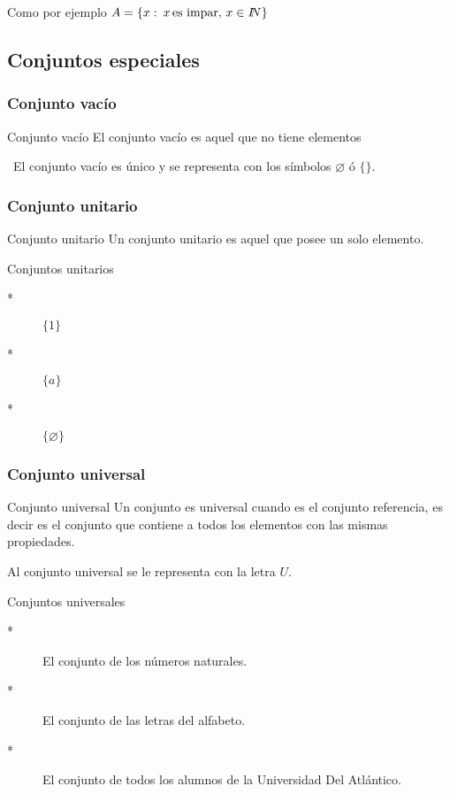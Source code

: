 Como por ejemplo $A=\{x:\: x\,\mbox{es impar, \ensuremath{x\in I\!\! N}}\}$


\subsection{Conjuntos especiales}


\subsubsection{Conjunto vacío}

\begin{definicionn}{Conjunto vacío} El conjunto vacío es aquel que
no tiene elementos\end{definicionn}

\notacion\ El conjunto vacío es único y se representa con los símbolos
$\varnothing$ ó $\{\}.$


\subsubsection{Conjunto unitario}

\begin{definicionn}{ Conjunto unitario} Un conjunto unitario es
aquel que posee un solo elemento.\end{definicionn}

\begin{ejems}{Conjuntos unitarios} 
\begin{description}
\item [{{*}}] $\{1\}$
\item [{{*}}] $\{a\}$
\item [{{*}}] $\{\varnothing\}$
\end{description}
\end{ejems}


\subsubsection{Conjunto universal}

\begin{definicionn}{Conjunto universal} Un conjunto es universal
cuando es el conjunto referencia, es decir es el conjunto que contiene
a todos los elementos con las mismas propiedades. \end{definicionn}

\notacion Al conjunto universal se le representa con la letra $U.$

\begin{ejems}{Conjuntos universales} 
\begin{description}
\item [{{*}}] El conjunto de los números naturales.
\item [{{*}}] El conjunto de las letras del alfabeto.
\item [{{*}}] El conjunto de todos los alumnos de la Universidad Del Atlántico. 
\end{description}
\end{ejems}



